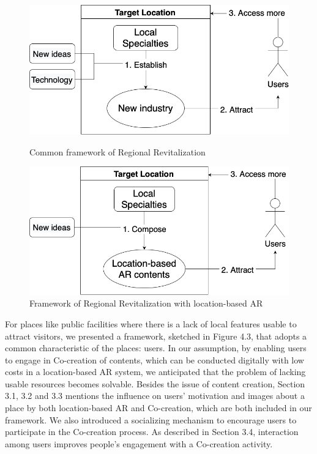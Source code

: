 \begin{figure}
  \begin{minipage}{0.48\textwidth}
    \centering
    \includegraphics[width=0.9\linewidth]{resources/4_methodology/common_vitalization.png}
      \caption{Common framework of Regional Revitalization}
  \end{minipage}\hfill
  \begin{minipage}{0.48\textwidth}
    \centering
    \includegraphics[width=0.9\linewidth]{resources/4_methodology/revitalization_with_AR.png}
      \caption{Framework of Regional Revitalization with location-based AR}
  \end{minipage}
\end{figure}

For places like public facilities where there is a lack of local features usable to attract visitors,
we presented a framework, sketched in Figure 4.3, that adopts a common characteristic of the places: users.
In our assumption, by enabling users to engage in Co-creation of contents, which can be conducted digitally with low costs in a location-based AR system,
we anticipated that the problem of lacking usable resources becomes solvable.
Besides the issue of content creation, Section 3.1, 3.2 and 3.3 mentions the influence on users' motivation and images about a place by both location-based AR and Co-creation,
which are both included in our framework.
We also introduced a socializing mechanism to encourage users to participate in the Co-creation process.
As described in Section 3.4, interaction among users improves people's engagement with a Co-creation activity.


